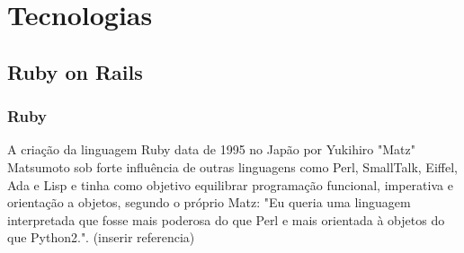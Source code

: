 \chapter{Tecnologias}
\label{cap:tecnologias}
\section{Ruby on Rails}
\subsection{Ruby}
    \par A criação da linguagem Ruby data de 1995 no Japão por Yukihiro "Matz" Matsumoto sob forte influência de outras linguagens como Perl, SmallTalk, Eiffel, Ada e Lisp e tinha como objetivo equilibrar programação funcional, imperativa e orientação a objetos, segundo o próprio Matz: "Eu queria uma linguagem interpretada que fosse mais poderosa do que Perl e mais orientada à objetos do que Python2.". (inserir referencia)
